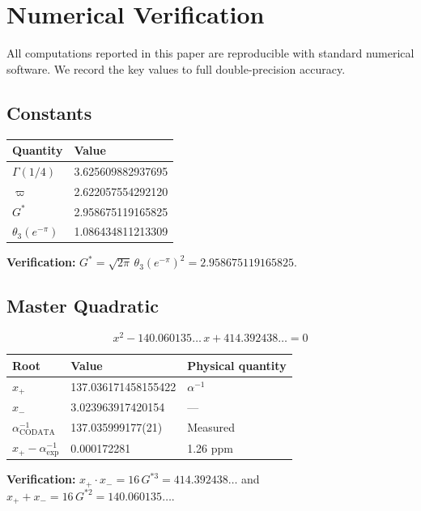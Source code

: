 \documentclass[12pt,a4paper]{article}
\newcommand{\vpi}{\varpi}
\begin{document}
\section{Numerical Verification}

All computations reported in this paper are reproducible with standard numerical software. We record the key values to full double-precision accuracy.

\subsection{Constants}

\begin{table}[H]
\centering
\begin{tabular}{@{}ll@{}}
\toprule
Quantity & Value \\
\midrule
$\Gamma(1/4)$ & 3.625609882937695 \\
$\vpi$ & 2.622057554292120 \\
$G^{*}$ & 2.958675119165825 \\
$\theta_{3}(e^{-\pi})$ & 1.086434811213309 \\
\bottomrule
\end{tabular}
\end{table}

\noindent\textbf{Verification:} $G^{*} = \sqrt{2\pi}\,\theta_{3}(e^{-\pi})^{2} = 2.958675119165825$.\;\checkmark

\subsection{Master Quadratic}

\[
x^{2} - 140.060135\ldots\,x + 414.392438\ldots = 0
\]

\begin{table}[H]
\centering
\begin{tabular}{@{}lll@{}}
\toprule
Root & Value & Physical quantity \\
\midrule
$x_{+}$ & 137.036171458155422 & $\alpha^{-1}$ \\
$x_{-}$ & 3.023963917420154 & --- \\
$\alpha^{-1}_{\mathrm{CODATA}}$ & 137.035999177(21) & Measured \\
$x_{+} - \alpha^{-1}_{\mathrm{exp}}$ & 0.000172281 & 1.26 ppm \\
\bottomrule
\end{tabular}
\end{table}

\noindent\textbf{Verification:} $x_{+} \cdot x_{-} = 16\,G^{*3} = 414.392438\ldots$ and $x_{+} + x_{-} = 16\,G^{*2} = 140.060135\ldots$.\;\checkmark
\end{document}

